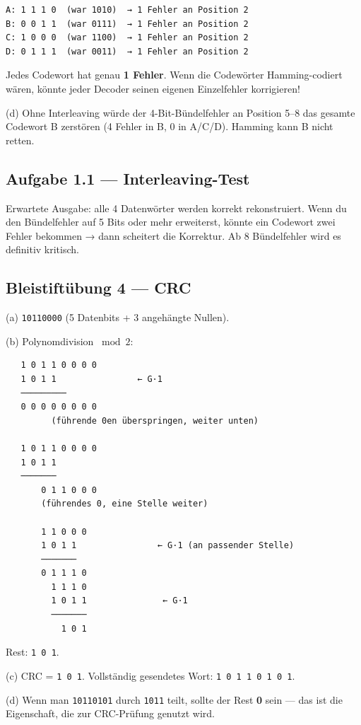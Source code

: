 \begin{verbatim}
A: 1 1 1 0  (war 1010)  → 1 Fehler an Position 2
B: 0 0 1 1  (war 0111)  → 1 Fehler an Position 2
C: 1 0 0 0  (war 1100)  → 1 Fehler an Position 2
D: 0 1 1 1  (war 0011)  → 1 Fehler an Position 2
\end{verbatim}

Jedes Codewort hat genau \textbf{1 Fehler}. Wenn die Codewörter
Hamming-codiert wären, könnte jeder Decoder seinen eigenen
Einzelfehler korrigieren!

(d) Ohne Interleaving würde der 4-Bit-Bündelfehler an Position 5–8
das gesamte Codewort B zerstören (4 Fehler in B, 0 in A/C/D). Hamming
kann B nicht retten.

\subsection*{Aufgabe 1.1 — Interleaving-Test}

Erwartete Ausgabe: alle 4 Datenwörter werden korrekt rekonstruiert.
Wenn du den Bündelfehler auf 5 Bits oder mehr erweiterst, könnte ein
Codewort zwei Fehler bekommen → dann scheitert die Korrektur. Ab 8
Bündelfehler wird es definitiv kritisch.

\subsection*{Bleistiftübung 4 — CRC}

(a) \texttt{10110000} (5 Datenbits + 3 angehängte Nullen).

(b) Polynomdivision $\bmod 2$:

\begin{verbatim}
   1 0 1 1 0 0 0 0
   1 0 1 1                ← G·1
   ─────────
   0 0 0 0 0 0 0 0
         (führende 0en überspringen, weiter unten)

   1 0 1 1 0 0 0 0
   1 0 1 1
   ───────
       0 1 1 0 0 0
       (führendes 0, eine Stelle weiter)

       1 1 0 0 0
       1 0 1 1                ← G·1 (an passender Stelle)
       ───────
       0 1 1 1 0
         1 1 1 0
         1 0 1 1               ← G·1
         ───────
           1 0 1
\end{verbatim}

Rest: \texttt{1 0 1}.

(c) CRC = \texttt{1 0 1}. Vollständig gesendetes Wort:
\texttt{1 0 1 1 0 1 0 1}.

(d) Wenn man \texttt{10110101} durch \texttt{1011} teilt, sollte der
Rest \textbf{0} sein — das ist die Eigenschaft, die zur CRC-Prüfung
genutzt wird.

